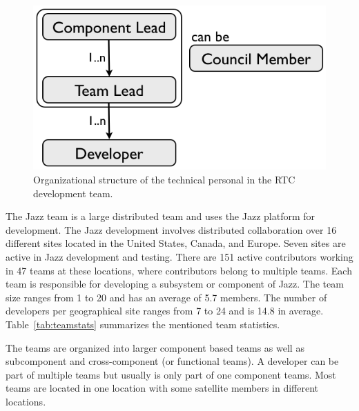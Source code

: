 \begin{figure}[t]
\begin{center}
\includegraphics[width=.8\textwidth]{figures/meet-rtc.tex/ppl-orga}
\caption{Organizational structure of the technical personal in the RTC development team.}
\label{fig:orgastruct}
\end{center}
\end{figure}

The Jazz team is a large distributed team and uses the Jazz platform for development. 
The Jazz development involves distributed collaboration over 16 different sites located in the United States, Canada, and Europe. 
Seven sites are active in Jazz development and testing. 
There are 151 active contributors working in 47 teams at these locations, where contributors belong to multiple teams. 
Each team is responsible for developing a subsystem or component of Jazz.
The team size ranges from 1 to 20 and has an average of 5.7 members. 
The number of developers per geographical site ranges from 7 to 24 and is 14.8 in average.
Table~\ref{tab:teamstats} summarizes the mentioned team statistics.

The teams are organized into larger component based teams as well as subcomponent and cross-component (or functional teams).
A developer can be part of multiple teams but usually is only part of one component teams.
Most teams are located in one location with some satellite members in different locations.

